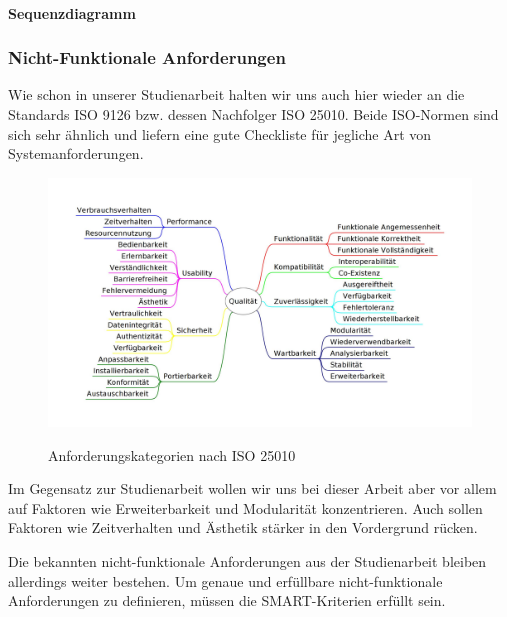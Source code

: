 \paragraph{Sequenzdiagramm}

\subsubsection{Nicht-Funktionale Anforderungen}
Wie schon in unserer Studienarbeit halten wir uns auch hier wieder an die Standards ISO 9126\cite{ISO9126} bzw. dessen Nachfolger ISO 25010\cite{ISO9126_ISO25010}. Beide ISO-Normen sind sich sehr ähnlich und liefern eine gute Checkliste für jegliche Art von Systemanforderungen.

\begin{figure}[h]
	\centering
	\includegraphics[width=1\linewidth]{img/anforderungen/quality}
	\caption[Anforderungskategorien nach ISO 25010]{Anforderungskategorien nach  ISO 25010}\cite{ISO25010_Bild}
	\label{fig:ISO 25010}
\end{figure}

Im Gegensatz zur Studienarbeit wollen wir uns bei dieser Arbeit aber vor allem auf Faktoren wie Erweiterbarkeit und Modularität konzentrieren. Auch sollen Faktoren wie Zeitverhalten und Ästhetik stärker in den Vordergrund rücken. 

Die bekannten nicht-funktionale Anforderungen aus der Studienarbeit bleiben allerdings weiter bestehen. Um genaue und erfüllbare nicht-funktionale Anforderungen zu definieren, müssen die SMART-Kriterien \cite{SMART} erfüllt sein.

